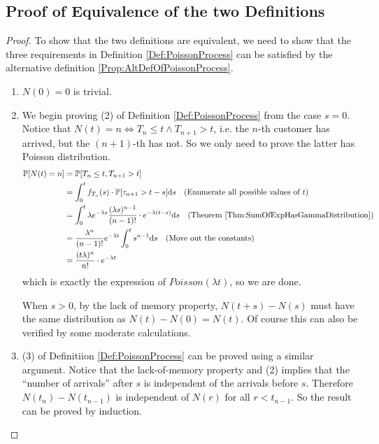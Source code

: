     \subsection{Proof of Equivalence of the two Definitions}
    \begin{proof}
        To show that the two definitions are equivalent, we need to show that the three requirements in Definition \ref{Def:PoissonProcess} can be satisfied by the alternative definition \ref{Prop:AltDefOfPoissonProcess}.
        \begin{enumerate}
            \item $N(0)=0$ is trivial.
            \item We begin proving (2) of Definition \ref{Def:PoissonProcess} from the case $s=0$. Notice that $N(t)=n \Leftrightarrow T_n \le t \wedge T_{n+1} > t$, i.e. the $n$-th customer has arrived, but the $(n+1)$-th has not. So we only need to prove the latter has Poisson distribution.
            \begin{align*}
                \mathbb{P}[N(t)=n] &= \mathbb{P}[T_n \le t, T_{n+1} > t]\\
                &= \int_0^tf_{T_n}(s)\cdot\mathbb{P}[\tau_{n+1} > t-s]\mathrm{d}s \quad \text{(Enumerate all possible values of $t$)}\\
                &= \int_0^t\lambda e^{-\lambda s}\frac{(\lambda s)^{n-1}}{(n-1)!}\cdot e^{-\lambda(t-s)}\mathrm{d}s \quad \text{(Theorem \ref{Thm:SumOfExpHasGammaDistribution})}\\
                &= \frac{\lambda^n}{(n-1)!}e^{-\lambda t}\int_0^t s^{n-1}\mathrm{d}s \quad \text{(Move out the constants)}\\
                &= \frac{(t\lambda)^n}{n!}\cdot e^{-\lambda t}
            \end{align*}
            which is exactly the expression of $Poisson(\lambda t)$, so we are done.

            When $s > 0$, by the lack of memory property, $N(t+s)-N(s)$ must have the same distribution as $N(t) - N(0) = N(t)$. Of course this can also be verified by some moderate calculations.
            \item (3) of Definitiion \ref{Def:PoissonProcess} can be proved using a similar argument. Notice that the lack-of-memory property and (2) implies that the ``number of arrivals'' after $s$ is independent of the arrivals before $s$. Therefore $N(t_n) - N(t_{n-1})$ is independent of $N(r)$ for all $r < t_{n-1}$. So the result can be proved by induction.
        \end{enumerate}
    \end{proof}


